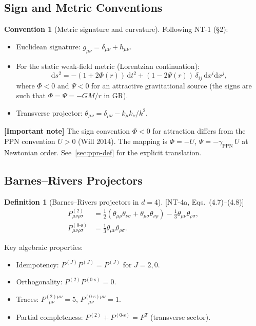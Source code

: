 \documentclass[11pt,a4paper]{article}
\theoremstyle{plain}
\theoremstyle{definition}
\newtheorem{definition}[theorem]{Definition}
\newtheorem{convention}[theorem]{Convention}
\theoremstyle{remark}
\renewcommand{\dd}{\mathrm{d}}
\newcommand{\fromlit}[1]{\textcolor{blue!70!black}{\textsf{[#1]}}}
\newcommand{\signcorrection}[1]{%
  \par\smallskip\noindent
  \colorbox{red!10}{\parbox{\dimexpr\linewidth-2\fboxsep}{%
    \textcolor{red!60!black}{\textbf{[Important note]}} #1}}%
  \par\smallskip}
\begin{document}
\subsection{Sign and Metric Conventions}\label{sec:conventions}

\begin{convention}[Metric signature and curvature]\label{conv:metric}
Following NT-1 (\S2):
\begin{itemize}[nosep]
  \item Euclidean signature: $g_{\mu\nu} = \delta_{\mu\nu} + h_{\mu\nu}$.
  \item For the static weak-field metric (Lorentzian continuation):
  \begin{equation}\label{eq:static-metric}
    \dd s^2 = -(1 + 2\Phi(r))\,\dd t^2
    + (1 - 2\Psi(r))\,\delta_{ij}\,\dd x^i\dd x^j,
  \end{equation}
  where $\Phi < 0$ and $\Psi < 0$ for an attractive gravitational
  source (the signs are such that $\Phi = \Psi = -GM/r$ in GR).
  \item Transverse projector: $\theta_{\mu\nu}
    = \delta_{\mu\nu} - k_\mu k_\nu / k^2$.
\end{itemize}
\end{convention}

\signcorrection{The sign convention $\Phi < 0$ for attraction
differs from the PPN convention $U > 0$ (Will 2014).
The mapping is $\Phi = -U$, $\Psi = -\gamma_{\mathrm{PPN}}\, U$
at Newtonian order.  See~\cref{sec:ppn-def} for the explicit
translation.}

\subsection{Barnes--Rivers Projectors}

\begin{definition}[Barnes--Rivers projectors in $d = 4$]
\label{def:BR}
\fromlit{NT-4a, Eqs.~(4.7)--(4.8)}
\begin{align}
  P^{(2)}_{\mu\nu\rho\sigma}
  &= \frac{1}{2}(\theta_{\mu\rho}\theta_{\nu\sigma}
  + \theta_{\mu\sigma}\theta_{\nu\rho})
  - \frac{1}{3}\theta_{\mu\nu}\theta_{\rho\sigma},
  \label{eq:P2}\\
  P^{(0\text{-s})}_{\mu\nu\rho\sigma}
  &= \frac{1}{3}\theta_{\mu\nu}\theta_{\rho\sigma}.
  \label{eq:P0s}
\end{align}
\end{definition}

\noindent Key algebraic properties:
\begin{itemize}[nosep]
  \item Idempotency: $P^{(J)}P^{(J)} = P^{(J)}$ for $J = 2, 0$.
  \item Orthogonality: $P^{(2)}P^{(0\text{-s})} = 0$.
  \item Traces: $P^{(2)\mu\nu}_{\ \ \ \mu\nu} = 5$,
    $P^{(0\text{-s})\mu\nu}_{\ \ \ \mu\nu} = 1$.
  \item Partial completeness: $P^{(2)} + P^{(0\text{-s})} = P^T$
    (transverse sector).
\end{itemize}
\end{document}
